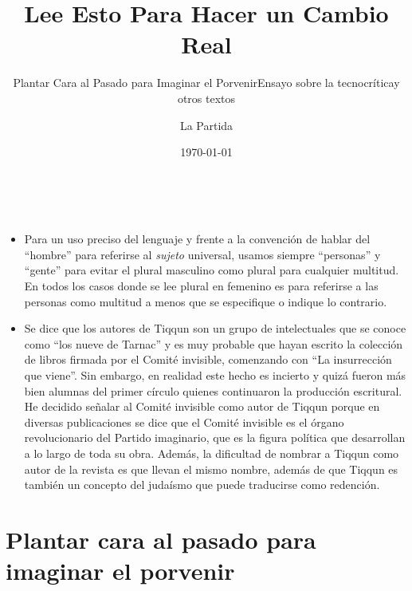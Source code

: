 \documentclass{scrbook}
\title{Lee Esto Para Hacer un Cambio Real}
\subtitle{Plantar Cara al Pasado para Imaginar el Porvenir}
\subtitle{Ensayo sobre la tecnocrítica}
\subtitle{y otros textos}
\author{La Partida}
\date{\today}
\begin{document}
\frontmatter
\maketitle

\cleardoubleemptypage%
\textcolor{white}{.}\\

\clearpage


\begin{itemize}
\item
  Para un uso preciso del lenguaje y frente a la convención de hablar
  del ``hombre'' para referirse al \emph{sujeto} universal, usamos
  siempre ``personas'' y ``gente'' para evitar el plural masculino como
  plural para cualquier multitud. En todos los casos donde se lee plural
  en femenino es para referirse a las personas como multitud a menos que
  se especifique o indique lo contrario.
\item
  Se dice que los autores de Tiqqun son un grupo de intelectuales que se
  conoce como ``los nueve de Tarnac'' y es muy probable que hayan
  escrito la colección de libros firmada por el Comité invisible,
  comenzando con ``La insurrección que viene''. Sin embargo, en realidad
  este hecho es incierto y quizá fueron más bien alumnas del primer
  círculo quienes continuaron la producción escritural. He decidido
  señalar al Comité invisible como autor de Tiqqun porque en diversas
  publicaciones se dice que el Comité invisible es el órgano
  revolucionario del Partido imaginario, que es la figura política que
  desarrollan a lo largo de toda su obra. Además, la dificultad de
  nombrar a Tiqqun como autor de la revista es que llevan el mismo
  nombre, además de que Tiqqun es también un concepto del judaísmo que
  puede traducirse como redención.
\end{itemize}

\clearpage
{}

\begin{quotation}
\end{quotation}

\tableofcontents
\listoffigures
\listoftables
\listoftodos

\mainmatter

\part{Plantar cara al pasado para imaginar el porvenir}
\end{document}
